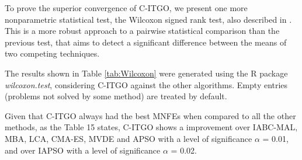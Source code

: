 To prove the superior convergence of C-ITGO, we present one more nonparametric statistical test, the Wilcoxon signed rank test, also described in \cite{Friedman}. This is a more robust approach to a pairwise statistical comparison than the previous test, that aims to detect a significant difference between the means of two competing techniques. 

The results shown in Table \ref{tab:Wilcoxon} were generated using the R package \textit{wilcoxon.test}, considering C-ITGO against the other algorithms. Empty entries (problems not solved by some method) are treated by default.




Given that C-ITGO always had the best MNFEs when compared to all the other methods, as the Table 15 states, C-ITGO shows a improvement over IABC-MAL, MBA, LCA, CMA-ES, MVDE and APSO  with a level of significance $\alpha$ = 0.01, and over IAPSO with a level of significance $\alpha$ = 0.02.